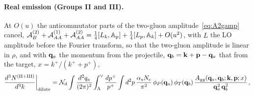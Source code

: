 \paragraph{Real emission (Groups II and III).} At $O(u)$ the anticommutator parts of the two-gluon amplitude~\eqref{eq:A2gamp} cancel, $\mathcal A_B^{(2)}+\mathcal A^{(1)}_{AA}+\mathcal A^{(2)}_{AA}=\frac14[L_k,\mathbb{A}_p]+\frac14[L_p,\mathbb{A}_k]+O(u^2)$, with $L$ the LO amplitude before the Fourier transform, so that the two-gluon amplitude is linear in $\rho$, and with $\mathbf{q}_a$ the momentum from the projectile, $\mathbf{q}_b=\mathbf{k}+\mathbf{p}-\mathbf{q}_a$ that from the target, $x=k^+/(k^++p^+)$,
\begin{align}\label{eq:dilute_real}
\frac{d^3N^{\rm (II+III)}}{d^3k}\bigg|_{\rm dilute}=\mathcal N_{\rm d}\int\frac{d^2q_a}{(2\pi)^2}\int_\Lambda^\vee\frac{dp^+}{p^+}\int d^2p\,\frac{\alpha_sN_c}{\pi^2}\,\phi_P(\mathbf{q}_a)\,\phi_T(\mathbf{q}_b)\,\frac{A_{gg}(\mathbf{q}_a,\mathbf{q}_b;\mathbf{k},\mathbf{p};x)}{\mathbf{q}_a^2\,\mathbf{q}_b^2}\,,
\end{align}
